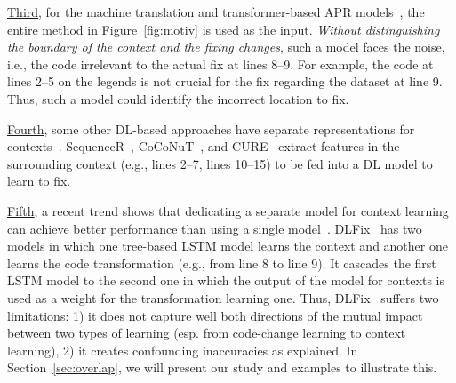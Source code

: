 
\underline{Third}, for the machine translation and transformer-based
APR
models~\cite{hata2018learning,tufano2019learning,tufano2018empirical},
the entire method in Figure~\ref{fig:motiv} is used as the input. {\em
  Without distinguishing the boundary of the context and the fixing
  changes}, such a model faces the noise, i.e., the code irrelevant to
the actual fix at lines 8--9. For example, the code at lines 2--5 on
the legends is not crucial for the fix regarding the dataset at line
9. Thus, such a model could identify the incorrect location to fix.

\underline{Fourth}, some other DL-based approaches have separate
representations for
contexts~\cite{chen2018sequencer,cure-icse21,lutellier2020coconut}.
SequenceR~\cite{chen2018sequencer},
CoCoNuT~\cite{lutellier2020coconut}, and CURE~\cite{cure-icse21}
extract features in the surrounding context (e.g., lines 2--7, lines
10--15) to be fed into a DL model to learn to fix.


\underline{Fifth}, a recent trend shows that
dedicating a separate model for context learning can achieve better
performance than using a single
model~\cite{icse20}. DLFix~\cite{icse20} has two models in which one
tree-based LSTM model learns the context and another one learns the
code transformation (e.g., from line 8 to line 9). It cascades the
first LSTM model to the second one in which the output of the model
for contexts is used as a weight for the transformation learning one.
Thus, DLFix~\cite{icse20} suffers two limitations: 1) it does not
capture well both directions of the mutual impact between two types of
learning (esp. from code-change learning to context learning), 2) it
creates confounding inaccuracies as explained.
%
In Section~\ref{sec:overlap}, we will present our study and examples
to illustrate this.


